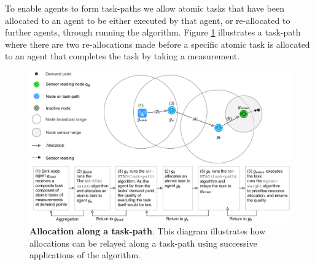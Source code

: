 To enable agents to form task-paths we allow atomic tasks that have been allocated to an agent to be either executed by that agent, or re-allocated to further agents, through running the \acronymATARIA{}{} algorithm. Figure \ref{fig:arc-flow} illustrates a task-path where there are two re-allocations made before a specific atomic task is allocated to an agent that completes the task by taking a measurement.
\begin{figure}[ht]
	\centering
	\includegraphics[width=0.8\linewidth, trim={25pt 0pt 25pt 0pt, clip}]{arc-flow}
	\caption{\textbf{Allocation along a task-path}. This diagram illustrates how allocations can be relayed along a task-path using successive applications of the \acronymATARIA{}{} algorithm.}
	\label{fig:arc-flow}
\end{figure}